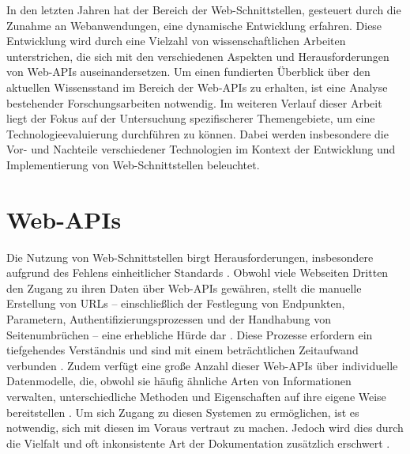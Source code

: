 \documentclass[draft,final]{vutinfth} %
\begin{document}
In den letzten Jahren hat der Bereich der Web-Schnittstellen, gesteuert durch die Zunahme an Webanwendungen, eine dynamische Entwicklung erfahren. Diese Entwicklung wird durch eine Vielzahl von wissenschaftlichen Arbeiten unterstrichen, die sich mit den verschiedenen Aspekten und Herausforderungen von Web-APIs auseinandersetzen. 
Um einen fundierten Überblick über den aktuellen Wissensstand im Bereich der Web-APIs zu erhalten, ist eine Analyse bestehender Forschungsarbeiten notwendig.  
Im weiteren Verlauf dieser Arbeit liegt der Fokus auf der Untersuchung spezifischerer Themengebiete, um eine Technologieevaluierung durchführen zu können. 
Dabei werden insbesondere die Vor- und Nachteile verschiedener Technologien im Kontext der Entwicklung und Implementierung von Web-Schnittstellen beleuchtet.


\section{Web-APIs}

Die Nutzung von Web-Schnittstellen birgt Herausforderungen, insbesondere aufgrund des Fehlens einheitlicher Standards \cite{Alrashed:2021:StandardizingAPIs}. 
Obwohl viele Webseiten Dritten den Zugang zu ihren Daten über Web-APIs gewähren, stellt die manuelle Erstellung von URLs -- einschließlich der Festlegung von Endpunkten, Parametern, Authentifizierungsprozessen und der Handhabung von Seitenumbrüchen -- eine erhebliche Hürde dar 
\cite{Alrashed:2021:StandardizingAPIs, Maleshkova:2010:InvestigationWebAPIs}. 
Diese Prozesse erfordern ein tiefgehendes Verständnis und sind mit einem beträchtlichen Zeitaufwand verbunden \cite{Alrashed:2021:StandardizingAPIs}. 
Zudem verfügt eine große Anzahl dieser Web-APIs über individuelle Datenmodelle, die, obwohl sie häufig ähnliche Arten von Informationen verwalten, unterschiedliche Methoden und Eigenschaften auf ihre eigene Weise bereitstellen \cite{Alrashed:2021:StandardizingAPIs}.
Um sich Zugang zu diesen Systemen zu ermöglichen, ist es notwendig, sich mit diesen im Voraus vertraut zu machen. 
Jedoch wird dies durch die Vielfalt und oft inkonsistente Art der Dokumentation zusätzlich erschwert \cite{Maleshkova:2010:InvestigationWebAPIs}.
\end{document}
